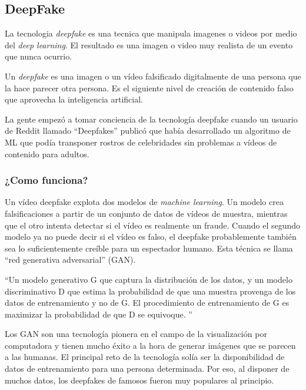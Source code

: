 \documentclass[runningheads]{llncs} %
\begin{document}
\subsection{DeepFake}
La tecnologia \textit{deepfake} es una tecnica que manipula imagenes o videos por medio del 
\textit{deep learning}. El resultado es una imagen o video muy realista de un evento que nunca ocurrio.
\cite{ej-deepfake2}

Un \textit{deepfake} es una imagen o un vídeo falsificado digitalmente de una persona 
que la hace parecer otra persona. Es el siguiente nivel de creación de contenido falso 
que aprovecha la inteligencia artificial. \cite{ej-deepfake2}

La gente empezó a tomar conciencia de la tecnología deepfake cuando un usuario de Reddit 
llamado \textquotedblleft{}Deepfakes\textquotedblright{} publicó que había desarrollado
un algoritmo de ML que podía transponer rostros de celebridades sin problemas
a vídeos de contenido para adultos. \cite{ej-deepfake2}
 
\subsubsection{¿Como funciona?}
Un vídeo deepfake explota dos modelos de \textit{machine learning}. 
Un modelo crea falsificaciones a partir de un conjunto de datos de vídeos de muestra, 
mientras que el otro intenta detectar si el vídeo es realmente un fraude. 
Cuando el segundo modelo ya no puede decir si el vídeo es falso, 
el deepfake probablemente también sea lo suficientemente creíble para un 
espectador humano. 
Esta técnica se llama
\textquotedblleft{}red generativa adversarial\textquotedblright{} (GAN). \cite{ej-deepfake2}

\textquotedblleft{}Un modelo generativo G que captura la distribución de los datos, 
y un modelo discriminativo D que estima la probabilidad de que una muestra 
provenga de los datos de entrenamiento y no de G. 
El procedimiento de entrenamiento de G es maximizar la probabilidad de que D se equivoque.
\textquotedblright{}
\cite{ej-deepfake4}


Los GAN son una tecnología pionera en el campo de la visualización por computadora 
y tienen mucho éxito a la hora de generar imágenes que se parecen a las humanas.
El principal reto de la tecnología solía ser la disponibilidad de datos de entrenamiento 
para una persona determinada. Por eso, al disponer de muchos datos, 
los deepfakes de famosos fueron muy populares al principio.
\end{document}

